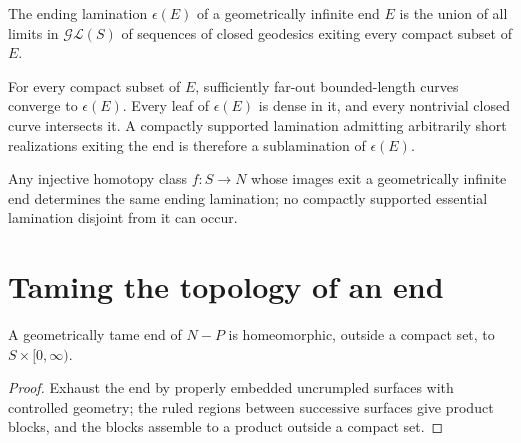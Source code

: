 \begin{definition}
\label{thurston-ch09-ending-lamination}
 The ending lamination $\epsilon(E)$ of a geometrically infinite end $E$ is the union of all limits in $\mathcal{GL}(S)$ of sequences of closed geodesics exiting every compact subset of $E$.
\end{definition}

\begin{proposition}
\label{thurston-ch09-ending-lamination-structure}
 For every compact subset of $E$, sufficiently far-out bounded-length curves converge to $\epsilon(E)$. Every leaf of $\epsilon(E)$ is dense in it, and every nontrivial closed curve intersects it. A compactly supported lamination admitting arbitrarily short realizations exiting the end is therefore a sublamination of $\epsilon(E)$.
\end{proposition}

\begin{corollary}
\label{thurston-ch09-ending-lamination-corollary}
 Any injective homotopy class $f:S\to N$ whose images exit a geometrically infinite end determines the same ending lamination; no compactly supported essential lamination disjoint from it can occur.
\end{corollary}

\section{Taming the topology of an end}

\begin{theorem}
\label{thurston-ch09-geometric-implies-topological-tameness}
 A geometrically tame end of $N-P$ is homeomorphic, outside a compact set, to $S\times[0,\infty)$.
\end{theorem}
\begin{proof}\sketch Exhaust the end by properly embedded uncrumpled surfaces with controlled geometry; the ruled regions between successive surfaces give product blocks, and the blocks assemble to a product outside a compact set.\end{proof}

